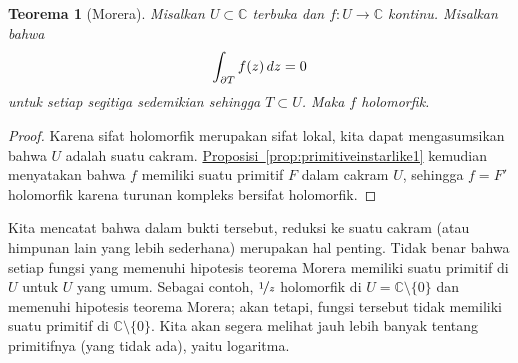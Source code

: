\documentclass[12pt,openany]{book}
\newcommand{\avoidbreak}{\postdisplaypenalty=100}
\newcommand{\C}{{\mathbb{C}}}
\theoremstyle{plain}
\newtheorem{thm}{Teorema}[section]
\theoremstyle{remark}
\theoremstyle{definition}
\theoremstyle{exercise}
\theoremstyle{example}
\newcommand{\propref}[1]{\hyperref[#1]{Proposisi~\ref*{#1}}}
\begin{document}
\begin{thm}[Morera]
%
\label{thm:Morera}%
Misalkan $U \subset \C$ terbuka dan $f \colon U \to \C$ kontinu.
Misalkan bahwa
\begin{equation*}
\int_{\partial T} f(z) \, dz = 0
\avoidbreak
\end{equation*}
untuk setiap segitiga sedemikian sehingga $T \subset U$.  Maka $f$ holomorfik.
\end{thm}

\begin{proof}
Karena sifat holomorfik merupakan sifat lokal, kita dapat mengasumsikan bahwa $U$ adalah suatu cakram.
\propref{prop:primitiveinstarlike1} kemudian menyatakan bahwa $f$ memiliki
suatu primitif $F$ dalam cakram $U$, sehingga $f = F'$ holomorfik
karena turunan kompleks bersifat holomorfik.
\end{proof}

Kita mencatat bahwa dalam bukti tersebut,
reduksi ke suatu cakram (atau himpunan lain yang lebih sederhana)
merupakan hal penting.  Tidak benar
bahwa setiap fungsi yang memenuhi hipotesis teorema Morera memiliki suatu
primitif di $U$ untuk $U$ yang umum.  Sebagai contoh, $\nicefrac{1}{z}$
holomorfik di $U = \C \setminus \{ 0 \}$ dan memenuhi hipotesis
teorema Morera; akan tetapi, fungsi tersebut tidak memiliki suatu primitif
di $\C \setminus \{ 0 \}$.  Kita akan segera melihat jauh lebih banyak
tentang primitifnya (yang tidak ada), yaitu logaritma.
\end{document}
